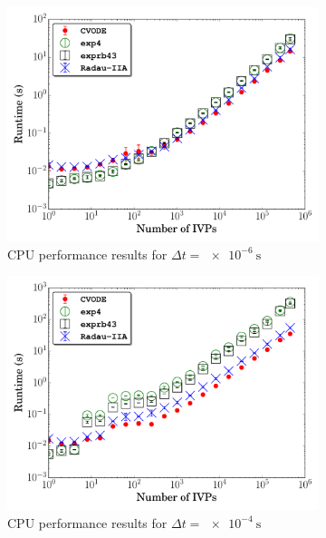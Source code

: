 \documentclass[preprint,review,11pt]{elsarticle}
\begin{document}
\begin{figure}[htbp]
  \centering
  \begin{subfigure}{0.49\textwidth}
      \includegraphics[width=\linewidth]{CH4_1e-06_cpu_nonorm.pdf}
      \caption{CPU performance results for $\Delta t = \SI{e-6}{\second}$}
  \end{subfigure}
  \begin{subfigure}{0.49\textwidth}
      \includegraphics[width=\linewidth]{CH4_1e-04_cpu_nonorm.pdf}
      \caption{CPU performance results for $\Delta t = \SI{e-4}{\second}$}
  \end{subfigure}\\
  \begin{subfigure}{0.49\textwidth}

\end{subfigure}
\end{figure}
\end{document}
